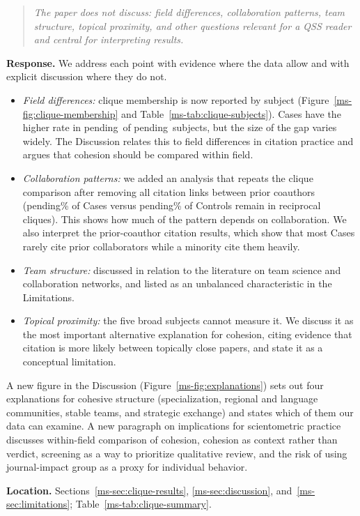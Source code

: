 \documentclass[11pt]{article}
\providecommand{\CliqueSubjectsCaseHigher}{pending}
\providecommand{\CliqueSubjectCount}{pending}
\providecommand{\CliqueNoCoauthorCaseMembershipPercent}{pending}
\providecommand{\CliqueNoCoauthorControlMembershipPercent}{pending}
\newcommand{\commenttext}[1]{\begin{quote}\itshape #1\end{quote}}
\newcommand{\response}{\textbf{Response.} }
\newcommand{\location}[1]{\textbf{Location.} #1.}
\begin{document}
\commenttext{The paper does not discuss: field differences, collaboration patterns, team structure, topical proximity, and other questions relevant for a QSS reader and central for interpreting results.}

\response We address each point with evidence where the data allow and with explicit discussion where they do not.
\begin{itemize}
  \item \emph{Field differences:} clique membership is now reported by subject (Figure~\ref{ms-fig:clique-membership} and Table~\ref{ms-tab:clique-subjects}).  Cases have the higher rate in \CliqueSubjectsCaseHigher\ of \CliqueSubjectCount\ subjects, but the size of the gap varies widely.  The Discussion relates this to field differences in citation practice and argues that cohesion should be compared within field.
  \item \emph{Collaboration patterns:} we added an analysis that repeats the clique comparison after removing all citation links between prior coauthors (\CliqueNoCoauthorCaseMembershipPercent\% of Cases versus \CliqueNoCoauthorControlMembershipPercent\% of Controls remain in reciprocal cliques).  This shows how much of the pattern depends on collaboration.  We also interpret the prior-coauthor citation results, which show that most Cases rarely cite prior collaborators while a minority cite them heavily.
  \item \emph{Team structure:} discussed in relation to the literature on team science and collaboration networks, and listed as an unbalanced characteristic in the Limitations.
  \item \emph{Topical proximity:} the five broad subjects cannot measure it.  We discuss it as the most important alternative explanation for cohesion, citing evidence that citation is more likely between topically close papers, and state it as a conceptual limitation.
\end{itemize}
A new figure in the Discussion (Figure~\ref{ms-fig:explanations}) sets out four explanations for cohesive structure (specialization, regional and language communities, stable teams, and strategic exchange) and states which of them our data can examine.  A new paragraph on implications for scientometric practice discusses within-field comparison of cohesion, cohesion as context rather than verdict, screening as a way to prioritize qualitative review, and the risk of using journal-impact group as a proxy for individual behavior.

\location{Sections~\ref{ms-sec:clique-results}, \ref{ms-sec:discussion}, and~\ref{ms-sec:limitations}; Table~\ref{ms-tab:clique-summary}}
\end{document}
